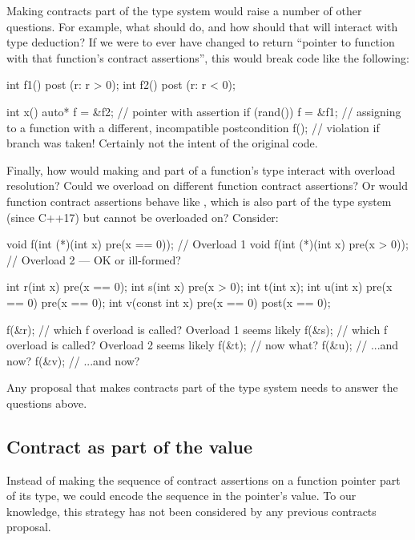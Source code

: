 Making contracts part of the type system would raise a number of other questions. For example, what should  do, and how should that will interact with type deduction? If we were to ever have  changed to return ``pointer to function with that function's contract assertions'', this would break code like the following:
\begin{codeblock}
int f1() post (r: r > 0);
int f2() post (r: r < 0);

int x() {
  auto* f = &f2;   // pointer with assertion 
  if (rand()) {
    f = &f1;  // assigning to a function with a different, incompatible postcondition
  }
  f();  // violation if branch was taken! Certainly not the intent of the original code.
}
\end{codeblock}
Finally, how would making  and  part of a function's type interact with overload resolution? Could we overload on different function contract assertions? Or would function contract assertions behave like , which is also part of the type system (since C++17) but cannot be overloaded on? Consider:
\begin{codeblock}
void f(int (*)(int x) pre(x == 0));  // Overload 1
void f(int (*)(int x) pre(x > 0));   // Overload 2 --- OK or ill-formed?

int r(int x) pre(x == 0);
int s(int x) pre(x > 0);
int t(int x);
int u(int x) pre(x == 0) pre(x == 0);
int v(const int x) pre(x == 0) post(x == 0);

f(&r);  // which f overload is called? Overload 1 seems likely
f(&s);  // which f overload is called? Overload 2 seems likely
f(&t);  // now what?
f(&u);  // ...and now?
f(&v);  // ...and now?
\end{codeblock}
Any proposal that makes contracts part of the type system needs to answer the questions above.


\subsection{Contract as part of the value}
\label{value}

Instead of making the sequence of contract assertions on a function pointer part of its type, we could encode the sequence in the pointer's value. To our knowledge, this strategy has not been considered by any previous contracts proposal.

